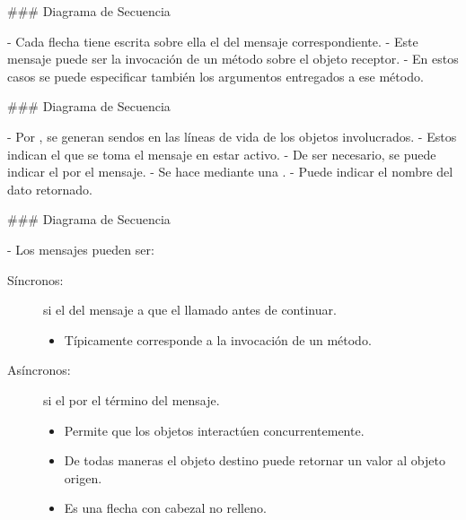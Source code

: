### Diagrama de Secuencia


- Cada flecha tiene escrita sobre ella el  del mensaje correspondiente.
    - Este mensaje puede ser la invocación de un método sobre el objeto receptor.
    - En estos casos se puede especificar también los argumentos entregados a ese método.

### Diagrama de Secuencia


- Por , se generan sendos  en las líneas de vida de los objetos involucrados.
    - Estos  indican el  que se toma el mensaje en estar activo.
- De ser necesario, se puede indicar el  por el mensaje.
    - Se hace mediante una .
    - Puede indicar el nombre del dato retornado.


### Diagrama de Secuencia


- Los mensajes pueden ser:
\vfill
\begin{description}
    \item[Síncronos:] si el  del mensaje  a que  el llamado antes
    de continuar.
        \begin{itemize}
            \item Típicamente corresponde a la invocación de un método.
        \end{itemize}
\vfill
    \item[Asíncronos:] si el  por el término del mensaje.
        \begin{itemize}
            \item Permite que los objetos interactúen concurrentemente.
            \item De todas maneras el objeto destino puede retornar un valor al objeto origen.
            \item Es una flecha con cabezal no relleno.
        \end{itemize}
\end{description}

